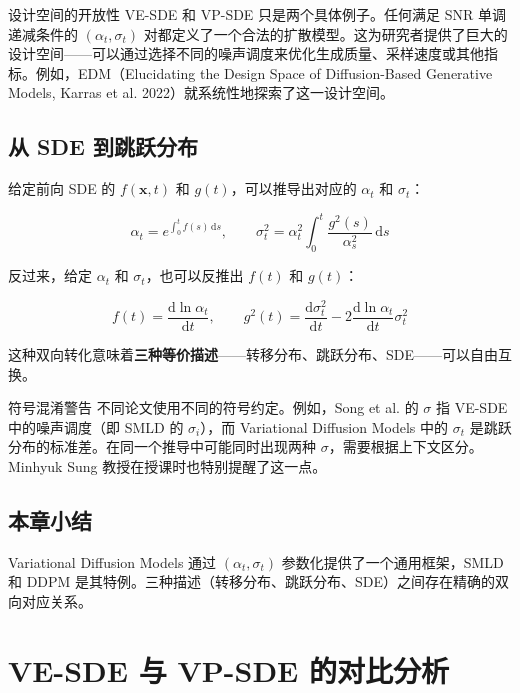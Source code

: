 \documentclass[a4paper]{article}
\begin{document}
\begin{knowledgebox}{设计空间的开放性}
VE-SDE 和 VP-SDE 只是两个具体例子。任何满足 SNR 单调递减条件的 $(\alpha_t, \sigma_t)$ 对都定义了一个合法的扩散模型。这为研究者提供了巨大的设计空间——可以通过选择不同的噪声调度来优化生成质量、采样速度或其他指标。例如，EDM（Elucidating the Design Space of Diffusion-Based Generative Models, Karras et al. 2022）就系统性地探索了这一设计空间。
\end{knowledgebox}

\subsection{从 SDE 到跳跃分布}

给定前向 SDE 的 $f(\mathbf{x}, t)$ 和 $g(t)$，可以推导出对应的 $\alpha_t$ 和 $\sigma_t$：

$$
\alpha_t = e^{\int_0^t f(s)\,\mathrm{d}s}, \qquad \sigma_t^2 = \alpha_t^2 \int_0^t \frac{g^2(s)}{\alpha_s^2}\,\mathrm{d}s
$$

反过来，给定 $\alpha_t$ 和 $\sigma_t$，也可以反推出 $f(t)$ 和 $g(t)$：

$$
f(t) = \frac{\mathrm{d} \ln \alpha_t}{\mathrm{d}t}, \qquad g^2(t) = \frac{\mathrm{d}\sigma_t^2}{\mathrm{d}t} - 2\frac{\mathrm{d}\ln \alpha_t}{\mathrm{d}t}\sigma_t^2
$$

这种双向转化意味着\textbf{三种等价描述}——转移分布、跳跃分布、SDE——可以自由互换。

\begin{warningbox}{符号混淆警告}
不同论文使用不同的符号约定。例如，Song et al. 的 $\sigma$ 指 VE-SDE 中的噪声调度（即 SMLD 的 $\sigma_i$），而 Variational Diffusion Models 中的 $\sigma_t$ 是跳跃分布的标准差。在同一个推导中可能同时出现两种 $\sigma$，需要根据上下文区分。Minhyuk Sung 教授在授课时也特别提醒了这一点。
\end{warningbox}

\subsection{本章小结}

Variational Diffusion Models 通过 $(\alpha_t, \sigma_t)$ 参数化提供了一个通用框架，SMLD 和 DDPM 是其特例。三种描述（转移分布、跳跃分布、SDE）之间存在精确的双向对应关系。


\section{VE-SDE 与 VP-SDE 的对比分析}
\end{document}
